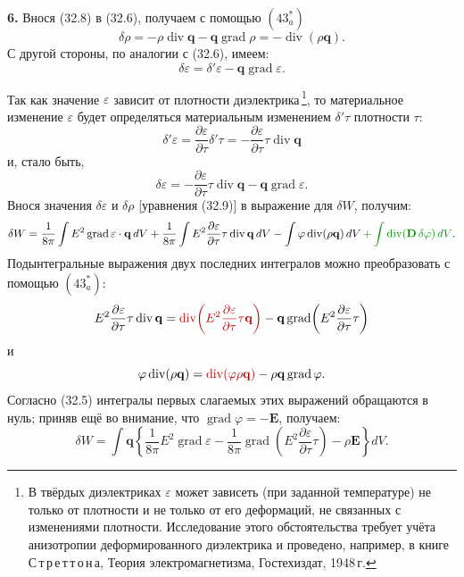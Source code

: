 \documentclass[a4paper,10pt]{article}
\newcommand{\redtext}[1]{\textcolor{redcolor}{#1}}
\newcommand{\redmath}[1]{\textcolor{redcolor}{#1}}
\newcommand{\modmath}[1]{\textcolor{modcolor}{#1}}
\begin{document}
\textbf{6.} Внося (32.8) в (32.6), получаем с помощью $(43^*_a)$
\begin{equation}
    \delta\rho = -\rho\operatorname{div}\mathbf{q}
               - \mathbf{q}\operatorname{grad}\rho
               = -\operatorname{div}(\rho\mathbf{q}).
    \tag{32.9}
\end{equation}
С другой стороны, по аналогии с (32.6), имеем:
$$
    \delta\varepsilon = \delta'\varepsilon - \mathbf{q}\operatorname{grad}\varepsilon.
$$


Так как значение $\varepsilon$ зависит от плотности
диэлектрика\,\footnote{В твёрдых диэлектриках $\varepsilon$ может
зависеть (при заданной температуре) не только от плотности и не только
от его деформаций, не связанных с изменениями плотности. Исследование
этого обстоятельства требует учёта анизотропии деформированного
диэлектрика и проведено, например, в книге
С\,т\,р\,е\,т\,т\,о\,н\,а, Теория электромагнетизма, Гостехиздат,
1948\,г.}, то материальное изменение $\varepsilon$ будет определяться
материальным изменением $\delta'\tau$ плотности $\tau$:
$$
    \delta'\varepsilon
    = \frac{\partial\varepsilon}{\partial\tau}\delta'\tau
    = -\frac{\partial\varepsilon}{\partial\tau}\tau\operatorname{div}\mathbf{q}
$$
и, стало быть,
\begin{equation}
    \delta\varepsilon
    = -\frac{\partial\varepsilon}{\partial\tau}\tau\operatorname{div}\mathbf{q}
    - \mathbf{q}\operatorname{grad}\varepsilon.
    \tag{32.9$'$}
\end{equation}
Внося значения $\delta\varepsilon$ и $\delta\rho$ [уравнения (32.9)]
в выражение для $\delta W$, получим:
$$
    \delta W = \frac{1}{8\pi}\int E^2\operatorname{grad}\varepsilon\cdot\mathbf{q}\,dV
             + \frac{1}{8\pi}\int E^2\frac{\partial\varepsilon}{\partial\tau}
               \tau\operatorname{div}\mathbf{q}\,dV
             - \int \varphi\operatorname{div}(\rho\mathbf{q})\,dV
             \,\modmath{+\int \operatorname{div}(\mathbf{D}\,\delta\varphi)\,dV}.
$$
Подынтегральные выражения двух последних интегралов можно преобразовать
с помощью $(43^*_a)$:
$$
    E^2\frac{\partial\varepsilon}{\partial\tau}\tau\operatorname{div}\mathbf{q}
    = \redmath{\operatorname{div}\!\left(E^2\frac{\partial\varepsilon}{\partial\tau}
      \tau\mathbf{q}\right)}
    - \mathbf{q}\operatorname{grad}\!\left(E^2\frac{\partial\varepsilon}{\partial\tau}
      \tau\right)
$$
и
$$
    \varphi\operatorname{div}(\rho\mathbf{q})
    = \redmath{\operatorname{div}(\varphi\rho\mathbf{q})}
    - \rho\mathbf{q}\operatorname{grad}\varphi.
$$
\redtext{Согласно (32.5) интегралы первых слагаемых этих выражений обращаются
в нуль;} приняв ещё во внимание, что $\operatorname{grad}\varphi = -\mathbf{E}$,
получаем:
$$
    \delta W = \int \mathbf{q}\left\{
        \frac{1}{8\pi}E^2\operatorname{grad}\varepsilon
        - \frac{1}{8\pi}\operatorname{grad}\!\left(
            E^2\frac{\partial\varepsilon}{\partial\tau}\tau
          \right)
        - \rho\mathbf{E}
    \right\}dV.
$$
\end{document}
